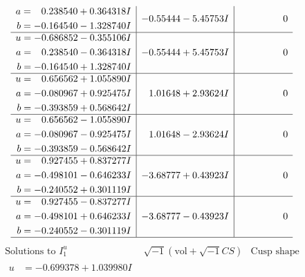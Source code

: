 \documentclass[1p]{elsarticle_modified}
\theoremstyle{definition}
\newcommand{\I}{\sqrt{-1}}
\begin{document}
$$\begin{array}{c|c|c}
\begin{aligned}
a &= \phantom{-}0.238540 + 0.364318 I \\
b &= -0.164540 - 1.328740 I\end{aligned}
 & -0.55444 - 5.45753 I & \phantom{-0.000000 } 0 \\ \hline\begin{aligned}
u &= -0.686852 - 0.355106 I \\
a &= \phantom{-}0.238540 - 0.364318 I \\
b &= -0.164540 + 1.328740 I\end{aligned}
 & -0.55444 + 5.45753 I & \phantom{-0.000000 } 0 \\ \hline\begin{aligned}
u &= \phantom{-}0.656562 + 1.055890 I \\
a &= -0.080967 + 0.925475 I \\
b &= -0.393859 + 0.568642 I\end{aligned}
 & \phantom{-}1.01648 + 2.93624 I & \phantom{-0.000000 } 0 \\ \hline\begin{aligned}
u &= \phantom{-}0.656562 - 1.055890 I \\
a &= -0.080967 - 0.925475 I \\
b &= -0.393859 - 0.568642 I\end{aligned}
 & \phantom{-}1.01648 - 2.93624 I & \phantom{-0.000000 } 0 \\ \hline\begin{aligned}
u &= \phantom{-}0.927455 + 0.837277 I \\
a &= -0.498101 - 0.646233 I \\
b &= -0.240552 + 0.301119 I\end{aligned}
 & -3.68777 + 0.43923 I & \phantom{-0.000000 } 0 \\ \hline\begin{aligned}
u &= \phantom{-}0.927455 - 0.837277 I \\
a &= -0.498101 + 0.646233 I \\
b &= -0.240552 - 0.301119 I\end{aligned}
 & -3.68777 - 0.43923 I & \phantom{-0.000000 } 0\\
 \hline 
 \end{array}$$\newpage$$\begin{array}{c|c|c}  
\text{Solutions to }I^u_{1}& \I (\text{vol} + \sqrt{-1}CS) & \text{Cusp shape}\\
 \hline 
\begin{aligned}
u &= -0.699378 + 1.039980 I \\

\end{aligned}
\end{array}$$
\end{document}
